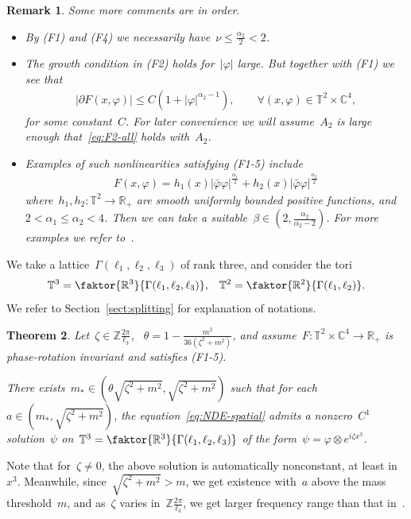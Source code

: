 \documentclass[10pt,a4paper]{amsart}
\newcommand{\p}{\partial}
\newcommand{\R}{\mathbb{R}}
\newcommand{\C}{\mathbb{C}}
\newcommand{\T}{\mathbb{T}}
\newcommand{\bZ}{\mathbb{Z}}
\newtheorem{thm}{Theorem}[section]
\newtheorem{rmk}[thm]{Remark}
\begin{document}
\begin{rmk}
    Some more comments are in order. 
    \begin{itemize}
        \item[(i)]  By (F1) and (F4) we necessarily have~$\nu\leq \frac{\alpha_2}{2}<2$.

        \item[(ii)] The growth condition in (F2) holds for~$|\varphi|$ large. 
                    But together with (F1) we see that
                    \begin{align}\label{eq:F2-all}
                        |\p F(x,\varphi)|\leq C(1+|\varphi|^{\alpha_2-1}), \qquad \forall (x,\varphi)\in\T^2\times\C^4,  
                    \end{align}
                    for some constant~$C$. 
                    For later convenience we will assume~$A_2$ is large enough that~\eqref{eq:F2-all} holds with~$A_2$. 

        \item[(iii)] Examples of such nonlinearities satisfying (F1-5) include 
                    \begin{align}
                        F(x,\varphi)=h_1(x)|\bar{\varphi}\varphi|^{\frac{\alpha_1}{2}} + h_2(x)|\bar{\varphi}\varphi|^{\frac{\alpha_2}{2}}
                    \end{align}
                    where~$h_1,h_2\colon \T^2 \to \R_+$ are smooth uniformly bounded positive functions, and~$2<\alpha_1 \leq \alpha_2 <4$. 
                    Then we can take a suitable~$\beta\in (2,\frac{\alpha_2}{\alpha_2-2})$. 
                    For more examples we refer to~\cite{WZ2026Stationary}. 
    \end{itemize}
\end{rmk}

We take a lattice~$\Gamma(\ell_1,\ell_2,\ell_3)$ of rank three, and consider the tori 
\begin{align}
    \T^3 =\faktor{\R^3}{\Gamma(\ell_1,\ell_2,\ell_3)}, &  & 
    \T^2 =\faktor{\R^2}{\Gamma(\ell_1,\ell_2)}. 
\end{align}
We refer to Section~\ref{sect:splitting} for explanation of notations. 
\begin{thm}\label{thm:existence-splitting}
    Let~$\zeta\in\bZ\frac{2\pi}{\ell_3}$, ~$\theta=1-\frac{m^2}{36(\zeta^2+m^2)}$, and assume~$F\colon \T^2\times \C^4\to\R_+$ is phase-rotation invariant and satisfies (F1-5). 
    
    There exists~$m_*\in (\theta \sqrt{\zeta^2+m^2}, \sqrt{\zeta^2+m^2})$ such that for each~$a\in(m_*,\sqrt{\zeta^2+m^2})$, the equation~\eqref{eq:NDE-spatial} admits a nonzero~$C^1$ solution~$\psi$ on~$\T^3=\faktor{\R^3}{\Gamma(\ell_1,\ell_2,\ell_3)}$ of the form~$\psi=\varphi\otimes e^{i\zeta x^3}$.
\end{thm}
Note that for~$\zeta\neq 0$, the above solution is automatically nonconstant, at least in~$x^3$. 
Meanwhile, since~$\sqrt{\zeta^2+m^2}>m$, we get existence with~$a$ above the mass threshold~$m$, and as~$\zeta$ varies in~$\bZ\frac{2\pi}{\ell_3}$, we get larger frequency range than that in~\cite{WZ2026Stationary}. 
\end{document}

